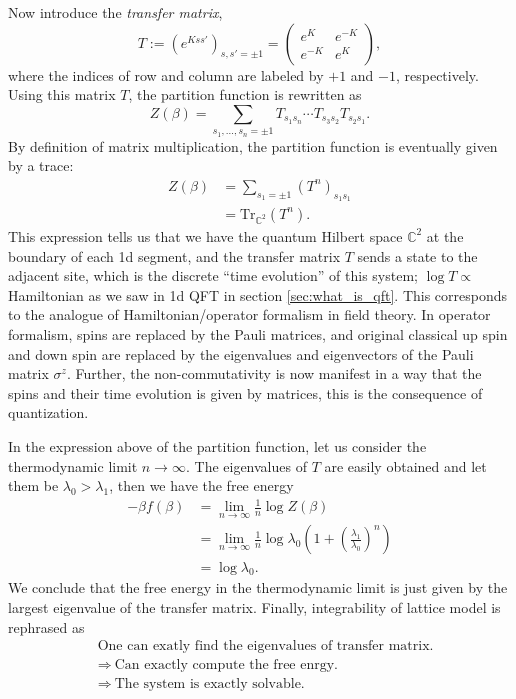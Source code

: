 Now introduce the \emph{transfer matrix},
\begin{equation}
  T  :=  \left(e^{Kss'}\right)_{s,s'=\pm1}
    =
    \left(\begin{array}{ll}
  e^{K}  &  e^{-K}  \\
  e^{-K}  &  e^{K}
\end{array}\right),
\end{equation}
where the indices of row and column are labeled by $+1$ and $-1$,
respectively. Using this matrix $T$, the partition function is rewritten
as
\begin{equation}
  Z\left(\beta\right)
    =\sum_{s_{1},\ldots,s_{n}=\pm1}  T_{s_{1}s_{n}}  \cdots  T_{s_{3}s_{2}}T_{s_{2}s_{1}}.
\end{equation}
By definition of matrix multiplication, the partition function is
eventually given by a trace:
\begin{align}
  Z(\beta)
  & =  \sum_{s_{1}=\pm1}\left(T^{n}\right)_{s_{1}s_{1}}  \nonumber \\
  & =  \mathrm{Tr}_{\mathbb{C}^{2}}\left(T^{n}\right).
\end{align}
This expression tells us that we have the quantum Hilbert space $\mathbb{C}^{2}$
at the boundary of each 1d segment, and the transfer matrix $T$ sends
a state to the adjacent site, which is the discrete ``time evolution''
of this system; $\log T\propto$ Hamiltonian as we saw in 1d QFT in
section \ref{sec:what_is_qft}. This corresponds to the analogue of Hamiltonian/operator
formalism in field theory. In operator formalism, spins
are replaced by the Pauli matrices, and original classical up spin
and down spin are replaced by the eigenvalues and eigenvectors of
the Pauli matrix $\sigma^{z}$. Further, the non-commutativity is
now manifest in a way that the spins and their time evolution is given
by matrices, this is the consequence of quantization.

In the expression above of the partition function, let us consider
the thermodynamic limit $n\to\infty$. The eigenvalues of
$T$ are easily obtained and let them be $\lambda_{0}>\lambda_{1}$,
then we have the free energy
\begin{align}
-\beta f(\beta)
  & =  \lim_{n\to\infty}\frac{1}{n}\log Z(\beta)\nonumber \\
  & =  \lim_{n\to\infty}\frac{1}{n}\log\lambda_{0}\left(1+\left(\frac{\lambda_{1}}{\lambda_{0}}\right)^{n}\right)\nonumber \\
  & =  \log\lambda_{0}.
\end{align}
We conclude that the free energy in the thermodynamic limit is just
given by the largest eigenvalue of the transfer matrix. Finally, integrability
of lattice model is rephrased as
\begin{align*}
  &  \textrm{One can exatly find the eigenvalues of transfer matrix.} \\
  &  \Rightarrow  ~  \textrm{Can exactly compute the free enrgy.} \\
  &  \Rightarrow  ~  \textrm{The system is exactly solvable.}
\end{align*}

